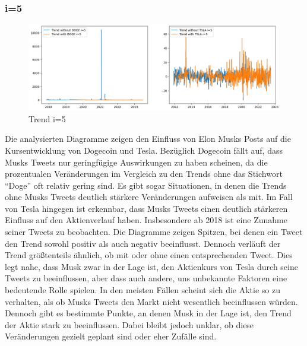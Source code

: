 \documentclass{article}
\begin{document}
\subsubsection{i=5}
\begin{figure}[!htb]
  	\includegraphics[width=\textwidth, center]{../imgs/Trendi5.png}
 	\caption{Trend i=5}
 	\label{fig:Trendi5}
\end{figure}
Die analysierten Diagramme zeigen den Einfluss von Elon Musks Posts auf die Kursentwicklung von Dogecoin und Tesla. Bezüglich Dogecoin fällt auf, dass Musks Tweets nur geringfügige Auswirkungen zu haben scheinen, da die prozentualen Veränderungen im Vergleich zu den Trends ohne das Stichwort ``Doge'' oft relativ gering sind. Es gibt sogar Situationen, in denen die Trends ohne Musks Tweets deutlich stärkere Veränderungen aufweisen als mit.
Im Fall von Tesla hingegen ist erkennbar, dass Musks Tweets einen deutlich stärkeren Einfluss auf den Aktienverlauf haben. Insbesondere ab 2018 ist eine Zunahme seiner Tweets zu beobachten. Die Diagramme zeigen Spitzen, bei denen ein Tweet den Trend sowohl positiv als auch negativ beeinflusst. Dennoch verläuft der Trend größtenteils ähnlich, ob mit oder ohne einen entsprechenden Tweet. Dies legt nahe, dass Musk zwar in der Lage ist, den Aktienkurs von Tesla durch seine Tweets zu beeinflussen, aber dass auch andere, uns unbekannte Faktoren eine bedeutende Rolle spielen.
In den meisten Fällen scheint sich die Aktie so zu verhalten, als ob Musks Tweets den Markt nicht wesentlich beeinflussen würden. Dennoch gibt es bestimmte Punkte, an denen Musk in der Lage ist, den Trend der Aktie stark zu beeinflussen. Dabei bleibt jedoch unklar, ob diese Veränderungen gezielt geplant sind oder eher Zufälle sind.
\end{document}
